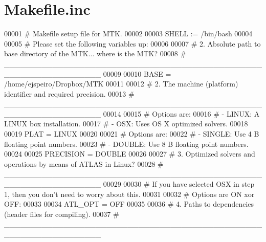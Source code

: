 \hypertarget{Makefile_8inc_source}{\section{Makefile.\-inc}
}

\begin{DoxyCode}
00001 \textcolor{preprocessor}{# Makefile setup file for MTK.}
00002 \textcolor{preprocessor}{}
00003 SHELL := /bin/bash
00004 
00005 \textcolor{preprocessor}{# Please set the following variables up:}
00006 \textcolor{preprocessor}{}
00007 \textcolor{preprocessor}{#   2. Absolute path to base directory of the MTK... where is the MTK?}
00008 \textcolor{preprocessor}{}\textcolor{preprocessor}{#   \_\_\_\_\_\_\_\_\_\_\_\_\_\_\_\_\_\_\_\_\_\_\_\_\_\_\_\_\_\_\_\_\_\_\_\_\_\_\_\_\_\_\_\_\_\_\_\_\_\_\_\_\_\_\_\_\_\_\_\_\_\_\_\_\_\_}
00009 \textcolor{preprocessor}{}
00010 BASE = /home/ejspeiro/Dropbox/MTK
00011 
00012 \textcolor{preprocessor}{#   2. The machine (platform) identifier and required precision.}
00013 \textcolor{preprocessor}{}\textcolor{preprocessor}{#   \_\_\_\_\_\_\_\_\_\_\_\_\_\_\_\_\_\_\_\_\_\_\_\_\_\_\_\_\_\_\_\_\_\_\_\_\_\_\_\_\_\_\_\_\_\_\_\_\_\_\_\_\_\_\_\_\_\_\_\_\_\_\_\_\_\_}
00014 \textcolor{preprocessor}{}
00015 \textcolor{preprocessor}{# Options are:}
00016 \textcolor{preprocessor}{}\textcolor{preprocessor}{# - LINUX: A LINUX box installation.}
00017 \textcolor{preprocessor}{}\textcolor{preprocessor}{# - OSX: Uses OS X optimized solvers.}
00018 \textcolor{preprocessor}{}
00019 PLAT = LINUX
00020 
00021 \textcolor{preprocessor}{# Options are:}
00022 \textcolor{preprocessor}{}\textcolor{preprocessor}{# - SINGLE: Use 4 B floating point numbers.}
00023 \textcolor{preprocessor}{}\textcolor{preprocessor}{# - DOUBLE: Use 8 B floating point numbers.}
00024 \textcolor{preprocessor}{}
00025 PRECISION = DOUBLE
00026 
00027 \textcolor{preprocessor}{#   3. Optimized solvers and operations by means of ATLAS in Linux?}
00028 \textcolor{preprocessor}{}\textcolor{preprocessor}{#   \_\_\_\_\_\_\_\_\_\_\_\_\_\_\_\_\_\_\_\_\_\_\_\_\_\_\_\_\_\_\_\_\_\_\_\_\_\_\_\_\_\_\_\_\_\_\_\_\_\_\_\_\_\_\_\_\_\_\_\_\_\_\_\_\_\_}
00029 \textcolor{preprocessor}{}
00030 \textcolor{preprocessor}{# If you have selected OSX in step 1, then you don't need to worry about this.}
00031 \textcolor{preprocessor}{}
00032 \textcolor{preprocessor}{# Options are ON xor OFF:}
00033 \textcolor{preprocessor}{}
00034 ATL\_OPT = OFF
00035 
00036 \textcolor{preprocessor}{#   4. Paths to dependencies (header files for compiling).}
00037 \textcolor{preprocessor}{}\textcolor{preprocessor}{#   \_\_\_\_\_\_\_\_\_\_\_\_\_\_\_\_\_\_\_\_\_\_\_\_\_\_\_\_\_\_\_\_\_\_\_\_\_\_\_\_\_\_\_\_\_\_\_\_\_\_\_\_\_\_\_\_\_\_\_\_\_\_\_\_\_\_}

\end{DoxyCode}
